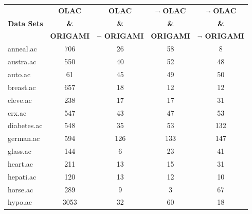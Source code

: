 \begin{table}[htbp]
	\centering
		\begin{tabular}{|l|c|c|c|c|}
		\hline
				& \textbf{OLAC}		& \textbf{OLAC}			& \textbf{$\neg$ OLAC}	& \textbf{$\neg$ OLAC}	\\
		\textbf{Data Sets}	& \textbf{\&}		& \textbf{\&}			& \textbf{\&}			& \textbf{\&}			\\
				& \textbf{ORIGAMI}	& \textbf{$\neg$ ORIGAMI}	& \textbf{ORIGAMI}		& \textbf{$\neg$ ORIGAMI}	\\
		\hline
		anneal.ac       & 706           & 26                 & 58                       & 8                             \\
		\hline
		austra.ac       & 550           & 40                 & 52                       & 48                            \\
		\hline
		auto.ac         & 61            & 45                 & 49                       & 50                            \\
		\hline
		breast.ac       & 657           & 18                 & 12                       & 12                            \\
		\hline
		cleve.ac        & 238           & 17                 & 17                       & 31                            \\
		\hline
		crx.ac          & 547           & 43                 & 47                       & 53                            \\
		\hline
		diabetes.ac     & 548           & 35                 & 53                       & 132                           \\
		\hline
		german.ac       & 594           & 126                & 133                      & 147                           \\
		\hline
		glass.ac        & 144           & 6                  & 23                       & 41                            \\
		\hline
		heart.ac        & 211           & 13                 & 15                       & 31                            \\
		\hline
		hepati.ac       & 120           & 13                 & 12                       & 10                            \\
		\hline
		horse.ac        & 289           & 9                  & 3                        & 67                            \\
		\hline
		hypo.ac         & 3053          & 32                 & 60                       & 18                            \\

\end{tabular}
\end{table}
